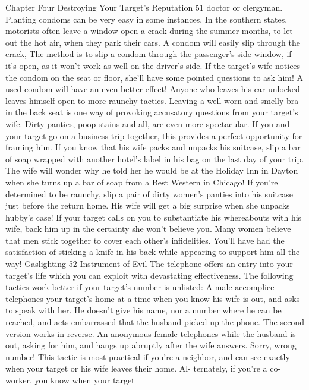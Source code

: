 \documentclass{book}
\begin{document}
Chapter Four 
Destroying Your Target's Reputation 
51 
doctor or clergyman. Planting condoms can be very easy in 
some instances, 
In the southern states, motorists often leave a window open 
a crack during the summer months, to let out the hot air, when 
they park their cars. A condom will easily slip through the 
crack, The method is to slip a condom through the passenger's 
side window, if it’s open, as it won't work as well on the driver's 
side. If the target's wife notices the condom on the seat or floor, 
she'll have some pointed questions to ask him! A used condom 
will have an even better effect! 
Anyone who leaves his car unlocked leaves himself open to 
more raunchy tactics. Leaving a well-worn and smelly bra in 
the back seat is one way of provoking accusatory questions 
from your target's wife. Dirty panties, poop stains and all, are 
even more spectacular. 
If you and your target go on a business trip together, this 
provides a perfect opportunity for framing him. If you know 
that his wife packs and unpacks his suitcase, slip a bar of soap 
wrapped with another hotel's label in his bag on the last day of 
your trip. The wife will wonder why he told her he would be at 
the Holiday Inn in Dayton when she turns up a bar of soap from 
a Best Western in Chicago! 
If you're determined to be raunchy, slip a pair of dirty 
women's panties into his suitcase just before the return home. 
His wife will get a big surprise when she unpacks hubby's case! 
If your target calls on you to substantiate his whereabouts 
with his wife, back him up in the certainty she won't believe 
you. Many women believe that men stick together to cover each 
other's infidelities. You'll have had the satisfaction of sticking a 
knife in his back while appearing to support him all the way!  Gaslighting 
52 
Instrument of Evil 
The telephone offers an entry into your target's life which 
you can exploit with devastating effectiveness. The following 
tactics work better if your target's number is unlisted: 
A male accomplice telephones your target's home at a time 
when you know his wife is out, and asks to speak with her. He 
doesn't give his name, nor a number where he can be reached, 
and acts embarrassed that the husband picked up the phone. 
The second version works in reverse. An anonymous female 
telephones while the husband is out, asking for him, and hangs 
up abruptly after the wife answers. Sorry, wrong number! 
This tactic is most practical if you're a neighbor, and can 
see exactly when your target or his wife leaves their home. Al- 
ternately, if you're a co-worker, you know when your target 
\end{document}
